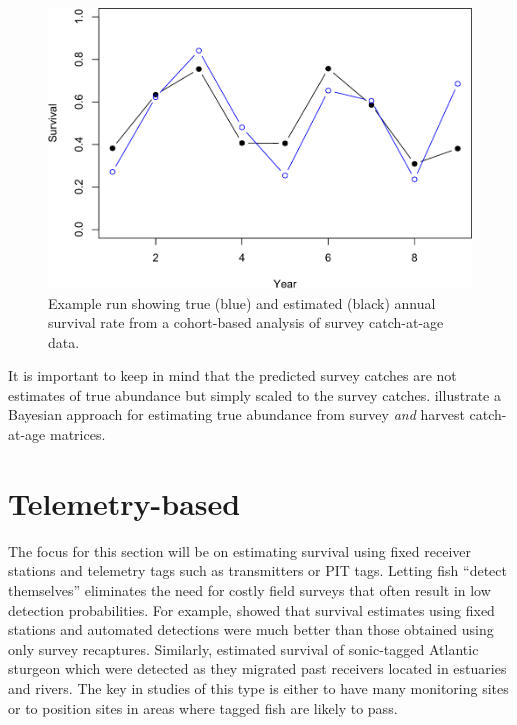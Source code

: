 \documentclass[
]{krantz}
\begin{document}
\begin{figure}
\includegraphics[width=0.9\linewidth]{bookdown_files/figure-latex/CohortPlot-1} \caption{Example run showing true (blue) and estimated (black) annual survival rate from a cohort-based analysis of survey catch-at-age data.}\label{fig:CohortPlot}
\end{figure}

It is important to keep in mind that the predicted survey catches are not estimates of true abundance but simply scaled to the survey catches. \citet{millar.meyer2000} illustrate a Bayesian approach for estimating true abundance from survey \emph{and} harvest catch-at-age matrices.

\hypertarget{TelemetryBased}{%
\section{Telemetry-based}\label{TelemetryBased}}

The focus for this section will be on estimating survival using fixed receiver stations and telemetry tags such as transmitters or PIT tags. Letting fish ``detect themselves'' eliminates the need for costly field surveys that often result in low detection probabilities. For example, \citet{hewitt.etal2010} showed that survival estimates using fixed stations and automated detections were much better than those obtained using only survey recaptures. Similarly, \citet{hightower.etal2015} estimated survival of sonic-tagged Atlantic sturgeon which were detected as they migrated past receivers located in estuaries and rivers. The key in studies of this type is either to have many monitoring sites or to position sites in areas where tagged fish are likely to pass.
\end{document}
